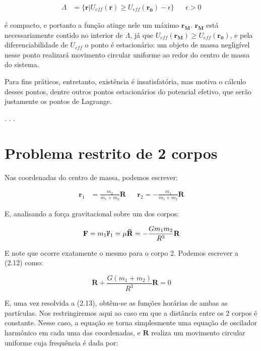 \begin{align} 
    \Lambda &= \{\mathbf{r} | U_{eff}(\mathbf{r}) \geq U_{eff}(\mathbf{r_0}) - \epsilon\} && \epsilon > 0
\end{align}

é compacto, e portanto a função atinge nele um máximo $\mathbf{r_M}$. $\mathbf{r_M}$ está necessariamente contido no interior de $\Lambda$, já que $U_{eff}(\mathbf{r_M}) \geq U_{eff}(\mathbf{r_0})$, e pela diferenciabilidade de $U_{eff}$ o ponto é estacionário: um objeto de massa negligível nesse ponto realizará movimento circular uniforme ao redor do centro de massa do sistema.

Para fins práticos, entretanto, existência é insatisfatória, mas motiva o cálculo desses pontos, dentre outros pontos estacionários do potencial efetivo, que serão justamente os pontos de Lagrange.

.						.						.

\section{Problema restrito de 2 corpos}

Nas coordenadas do centro de massa, podemos escrever:

\begin{align}
    \mathbf{r}_1 &=  \frac{m_2}{m_1 + m_2}\mathbf{R} && \mathbf{r}_2 = - \frac{m_1}{m_1 + m_2}\mathbf{R}
\end{align}

E, analisando a força gravitacional sobre um dos corpos:

\begin{equation}
\mathbf{F} = m_1\mathbf{\ddot{r}}_1 = \mu\mathbf{\ddot{R}} = -\frac{Gm_1m_2}{R^3}\mathbf{R} \\
\end{equation}

E note que ocorre exatamente o mesmo para o corpo 2. Podemos escrever a (2.12) como:

\begin{equation}
\mathbf{\ddot{R}} + \frac{G(m_1+m_2)}{R^3}\mathbf{{R}} = 0
\end{equation}

E, uma vez resolvida a (2.13), obtêm-se as funções horárias de ambas as partículas. Nos restringiremos aqui ao caso em que a distância entre os 2 corpos é constante. Nesse caso, a equação se torna simplesmente uma equação de oscilador harmônico em cada uma das coordenadas, e $\mathbf{R}$
realiza um movimento circular uniforme cuja frequência é dada por:


